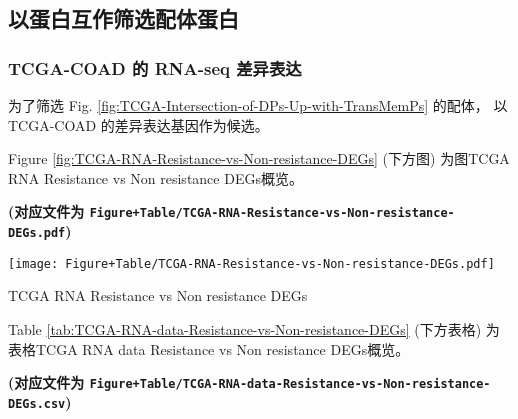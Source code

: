 \documentclass[
]{article}
\begin{document}
\hypertarget{ux4ee5ux86cbux767dux4e92ux4f5cux7b5bux9009ux914dux4f53ux86cbux767d-1}{%
\subsection{以蛋白互作筛选配体蛋白}\label{ux4ee5ux86cbux767dux4e92ux4f5cux7b5bux9009ux914dux4f53ux86cbux767d-1}}

\hypertarget{tcga-coad-ux7684-rna-seq-ux5deeux5f02ux8868ux8fbe}{%
\subsubsection{TCGA-COAD 的 RNA-seq 差异表达}\label{tcga-coad-ux7684-rna-seq-ux5deeux5f02ux8868ux8fbe}}

为了筛选 Fig. \ref{fig:TCGA-Intersection-of-DPs-Up-with-TransMemPs} 的配体，
以 TCGA-COAD 的差异表达基因作为候选。

Figure \ref{fig:TCGA-RNA-Resistance-vs-Non-resistance-DEGs} (下方图) 为图TCGA RNA Resistance vs Non resistance DEGs概览。

\textbf{(对应文件为 \texttt{Figure+Table/TCGA-RNA-Resistance-vs-Non-resistance-DEGs.pdf})}

\def\@captype{figure}
\begin{center}
\texttt{[image: Figure+Table/TCGA-RNA-Resistance-vs-Non-resistance-DEGs.pdf]}
\caption{TCGA RNA Resistance vs Non resistance DEGs}\label{fig:TCGA-RNA-Resistance-vs-Non-resistance-DEGs}
\end{center}

Table \ref{tab:TCGA-RNA-data-Resistance-vs-Non-resistance-DEGs} (下方表格) 为表格TCGA RNA data Resistance vs Non resistance DEGs概览。

\textbf{(对应文件为 \texttt{Figure+Table/TCGA-RNA-data-Resistance-vs-Non-resistance-DEGs.csv})}
\end{document}
